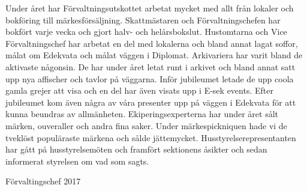 \documentclass[../_main/handlingar.tex]{subfiles}
\begin{document}
Under året har Förvaltningsutskottet arbetat mycket med allt från lokaler och bokföring till märkesförsäljning. Skattmästaren och Förvaltningschefen har bokfört varje vecka och gjort halv- och helårsbokslut. 
Hustomtarna och Vice Förvaltningschef har arbetat en del med lokalerna och bland annat lagat soffor, målat om Edekvata och målat väggen i Diplomat. 
Arkivariera har varit bland de aktivaste någonsin. De har under året letat runt i arkivet och bland annat satt upp nya affischer och tavlor på väggarna. Inför jubileumet letade de upp coola gamla grejer att visa och en del har även visats upp i E-sek events. Efter jubileumet kom även några av våra presenter upp på väggen i Edekvata för att kunna beundras av allmänheten. 
Ekiperingsexperterna har under året sålt märken, ouveraller och andra fina saker. Under märkespickniquen hade vi de tveklöst populäraste märkena och sålde jättemycket. 
Husstyrelserepresentanten har gått på husstyrelsemöten och framfört sektionens åsikter och sedan informerat styrelsen om vad som sagts. 


\begin{signatures}{1}
    \mvh
    \signature{Sophia Grimmei\ss\ Grahm}{Förvaltingschef 2017}
\end{signatures}
\end{document}
